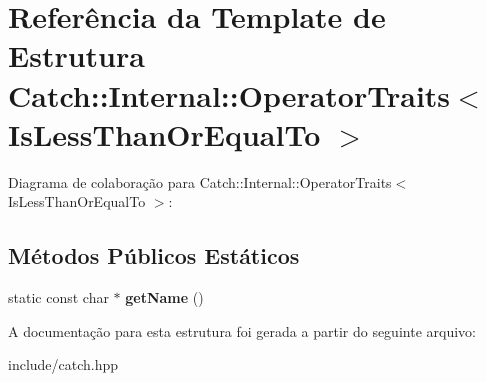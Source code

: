 \hypertarget{structCatch_1_1Internal_1_1OperatorTraits_3_01IsLessThanOrEqualTo_01_4}{}\section{Referência da Template de Estrutura Catch\+:\+:Internal\+:\+:Operator\+Traits$<$ Is\+Less\+Than\+Or\+Equal\+To $>$}
\label{structCatch_1_1Internal_1_1OperatorTraits_3_01IsLessThanOrEqualTo_01_4}


Diagrama de colaboração para Catch\+:\+:Internal\+:\+:Operator\+Traits$<$ Is\+Less\+Than\+Or\+Equal\+To $>$\+:
\subsection*{Métodos Públicos Estáticos}
\begin{DoxyCompactItemize}
\item 
static const char $\ast$ {\bfseries get\+Name} ()\hypertarget{structCatch_1_1Internal_1_1OperatorTraits_3_01IsLessThanOrEqualTo_01_4_ae8578813bc847838f10448c1541a9d7b}{}\label{structCatch_1_1Internal_1_1OperatorTraits_3_01IsLessThanOrEqualTo_01_4_ae8578813bc847838f10448c1541a9d7b}

\end{DoxyCompactItemize}


A documentação para esta estrutura foi gerada a partir do seguinte arquivo\+:\begin{DoxyCompactItemize}
\item 
include/catch.\+hpp\end{DoxyCompactItemize}
